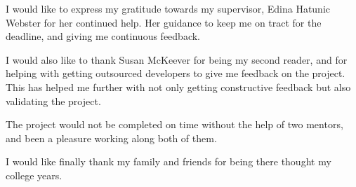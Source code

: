 \clearpage


\begin{acknowledgements}

I would like to express my gratitude towards my supervisor, Edina Hatunic Webster for her continued help. Her guidance to keep me on tract for the deadline, and giving me continuous feedback.

I would also like to thank Susan McKeever for being my second reader, and for helping with getting outsourced developers to give me feedback on the project. This has helped me further with not only getting constructive feedback but also validating the project. 

The project would not be completed on time without the help of two mentors, and been a pleasure working along both of them.

I would like finally thank my family and friends for being there thought my college years.

\end{acknowledgements}